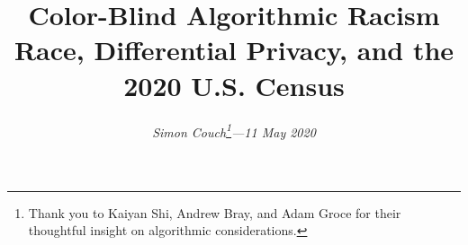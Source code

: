 \documentclass[12pt]{article}
\begin{document}
\makeatletter
\renewcommand\section{\@startsection {section}{1}{\z@}%
                                   {-1.5ex\@plus -1ex \@minus -.2ex}%
                                   {.75ex \@plus .2ex}%
                                   {\normalfont\normalsize\bfseries}}%
\renewcommand\subsection{\@startsection{subsection}{2}{\z@}%
                                   {-1.0ex\@plus -1ex \@minus -.2ex}%
                                   {.5ex \@plus .2ex}%
                                   {\normalfont\normalsize\itshape}}%
\makeatother


\title{\vspace{-10pt} 
  Color-Blind Algorithmic Racism \\
  \large Race, Differential Privacy, and the 2020 U.S. Census}
       
\author{\vspace{-20pt} \normalsize \textit{Simon Couch\footnote{Thank you to Kaiyan Shi, Andrew Bray, and Adam Groce for their thoughtful insight on algorithmic considerations.}—11 May 2020}}

\date{}

\maketitle


\vspace{-20pt}






\clearpage




\clearpage

%
\end{document}
